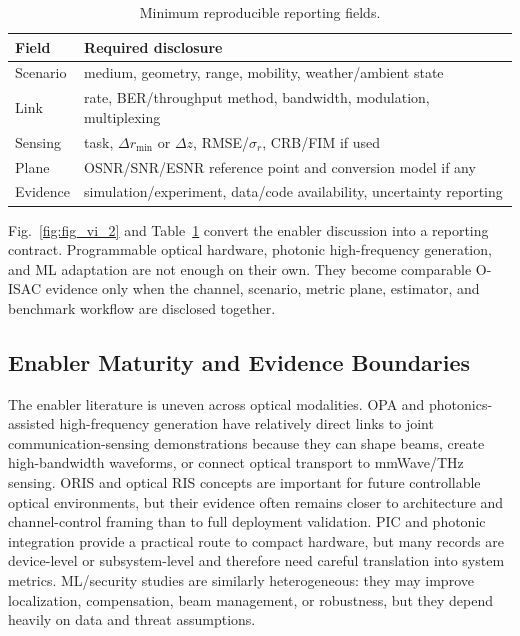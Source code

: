 \documentclass[letterpaper,journal]{IEEEtran}
\begin{document}
\begin{table}[!t]
    \caption{Minimum reproducible reporting fields.}
    \label{tab:vi_d_reporting}
    \centering
    \scriptsize
    \setlength{\tabcolsep}{2.5pt}
    \renewcommand{\arraystretch}{1.05}
    \begin{tabularx}{\linewidth}{@{}p{1.8cm}X@{}}
        \toprule
        Field & Required disclosure \\
        \midrule
        Scenario & medium, geometry, range, mobility, weather/ambient state \\
        Link & rate, BER/throughput method, bandwidth, modulation, multiplexing \\
        Sensing & task, $\Delta r_{\min}$ or $\Delta z$, RMSE/$\sigma_r$, CRB/FIM if used \\
        Plane & OSNR/SNR/ESNR reference point and conversion model if any \\
        Evidence & simulation/experiment, data/code availability, uncertainty reporting \\
        \bottomrule
    \end{tabularx}
\end{table}

Fig.~\ref{fig:fig_vi_2} and Table~\ref{tab:vi_d_reporting} convert the enabler discussion into a reporting contract. Programmable optical hardware, photonic high-frequency generation, and ML adaptation are not enough on their own. They become comparable O-ISAC evidence only when the channel, scenario, metric plane, estimator, and benchmark workflow are disclosed together.

\subsection{Enabler Maturity and Evidence Boundaries}

The enabler literature is uneven across optical modalities. OPA and photonics-assisted high-frequency generation have relatively direct links to joint communication-sensing demonstrations because they can shape beams, create high-bandwidth waveforms, or connect optical transport to mmWave/THz sensing. ORIS and optical RIS concepts are important for future controllable optical environments, but their evidence often remains closer to architecture and channel-control framing than to full deployment validation. PIC and photonic integration provide a practical route to compact hardware, but many records are device-level or subsystem-level and therefore need careful translation into system metrics. ML/security studies are similarly heterogeneous: they may improve localization, compensation, beam management, or robustness, but they depend heavily on data and threat assumptions.
\end{document}
